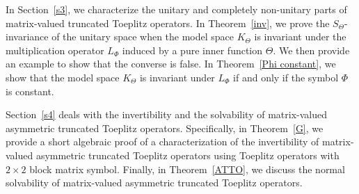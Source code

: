 \documentclass{amsart}
\theoremstyle{definition}
\newcommand{\hsp}{\mathcal{H}}
\def\ni{\noindent}
\def\LL{{\mathcal L}}
\begin{document}
In Section~\ref{s3}, we characterize the unitary and completely non-unitary parts of matrix-valued truncated Toeplitz operators. %
In Theorem~\ref{inv}, we prove the $S_\Theta$-invariance of the unitary space when the model space $K_\Theta$  is invariant under the multiplication operator $L_\Phi$ induced by a pure inner function $\Theta$. We then provide an example to show that the converse is false. In Theorem~\ref{Phi constant}, we show that the model space $K_\Theta$ is invariant under $L_\Phi$ if and only if the symbol $\Phi$ is constant. 

Section~\ref {s4} deals with the invertibility and the solvability of matrix-valued asymmetric truncated Toeplitz operators. Specifically, in Theorem~\ref{G}, we provide a short algebraic proof of a characterization of 
 the invertibility of matrix-valued asymmetric truncated Toeplitz operators using Toeplitz
operators with $2 \times 2$ block matrix symbol. Finally, in Theorem~\ref{ATTO}, we discuss the normal solvability of matrix-valued asymmetric truncated Toeplitz operators. 






\end{document}
